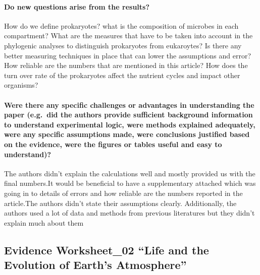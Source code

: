 \documentclass[]{article}
\let\oldparagraph\paragraph
\renewcommand{\paragraph}[1]{\oldparagraph{#1}\mbox{}}
\begin{document}
\paragraph{Do new questions arise from the
results?}\label{do-new-questions-arise-from-the-results}

How do we define prokaryotes? what is the composition of microbes in
each compartment? What are the measures that have to be taken into
account in the phylogenic analyses to distinguish prokaryotes from
eukaroytes? Is there any better measuring techniques in place that can
lower the assumptions and error? How reliable are the numbers that are
mentioned in this article? How does the turn over rate of the
prokaryotes affect the nutrient cycles and impact other organisms?

\paragraph{Were there any specific challenges or advantages in
understanding the paper (e.g.~did the authors provide sufficient
background information to understand experimental logic, were methods
explained adequately, were any specific assumptions made, were
conclusions justified based on the evidence, were the figures or tables
useful and easy to
understand)?}\label{were-there-any-specific-challenges-or-advantages-in-understanding-the-paper-e.g.did-the-authors-provide-sufficient-background-information-to-understand-experimental-logic-were-methods-explained-adequately-were-any-specific-assumptions-made-were-conclusions-justified-based-on-the-evidence-were-the-figures-or-tables-useful-and-easy-to-understand}

The authors didn't explain the calculations well and mostly provided us
with the final numbers.It would be beneficial to have a supplementary
attached which was going in to details of errors and how reliable are
the numbers reported in the article.The authors didn't state their
assumptions clearly. Additionally, the authors used a lot of data and
methods from previous literatures but they didn't explain much about
them

\subsection{\texorpdfstring{Evidence Worksheet\_02 ``Life and the
Evolution of Earth's
Atmosphere''}{Evidence Worksheet\_02 Life and the Evolution of Earth's Atmosphere}}\label{evidence-worksheet_02-life-and-the-evolution-of-earths-atmosphere}
\end{document}
